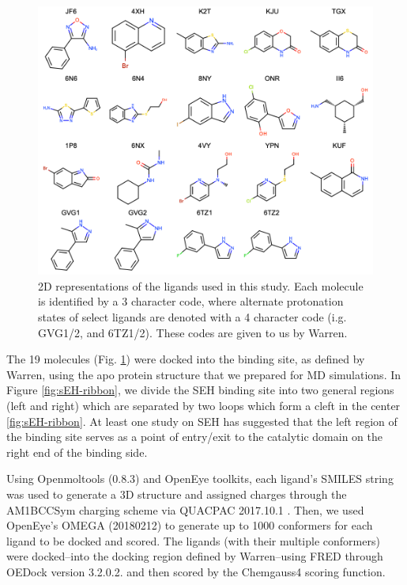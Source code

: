 \begin{figure}
    \centering
    \includegraphics{chapter5/Figures/2d-molecules.png}
    \caption[SEH 2D Ligand Representation]{2D representations of the ligands used in this study. Each molecule is identified by a 3 character code, where alternate protonation states of select ligands are denoted with a 4 character code (i.g. GVG1/2, and 6TZ1/2). These codes are given to us by Warren.}
    \label{fig:2D-molecules}
\end{figure}

The 19 molecules (Fig. \ref{fig:2D-molecules}) were docked into the binding site, as defined by Warren, using the apo protein structure that we prepared for MD simulations.
In Figure \ref{fig:sEH-ribbon}, we divide the SEH binding site into two general regions (left and right) which are separated by two loops which form a cleft in the center \ref{fig:sEH-ribbon}.
At least one study on SEH has suggested that the left region of the binding site serves as a point of entry/exit to the catalytic domain on the right end of the binding side\cite{lotz_unbiased_2018}.

Using Openmoltools (0.8.3)\cite{openmoltools} and OpenEye toolkits, each ligand's SMILES string was used to generate a 3D structure and assigned charges through the AM1BCCSym charging scheme via QUACPAC 2017.10.1 \cite{jakalian_fast_2002}. 
Then, we used OpenEye's OMEGA (20180212) to generate up to 1000 conformers for each ligand to be docked and scored\cite{hawkins_conformer_2010}.
The ligands (with their multiple conformers) were docked--into the docking region defined by Warren--using FRED through OEDock version 3.2.0.2. and then scored by the Chemgauss4 scoring function\cite{mcgann_fred_2011}.


